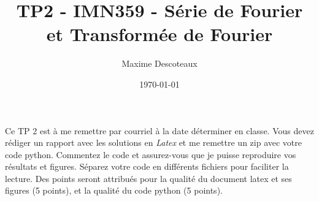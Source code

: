 \documentclass{article}
\title{TP2 - IMN359 - Série de Fourier et Transformée de Fourier}
\author{Maxime Descoteaux}
\date{\today}
\begin{document}
\maketitle

Ce TP 2 est à me remettre par courriel à la date déterminer en classe. 
Vous devez rédiger un rapport avec les solutions en 
\emph{Latex} et me remettre un zip avec votre code python. Commentez
le code et assurez-vous que je puisse reproduire vos 
résultats et figures. 
Séparez votre code en différents fichiers pour faciliter la
lecture. Des points seront attribués pour la qualité du document latex
et ses figures (5 points), et la qualité du code python (5 points). 

\section*{}
\end{document}

